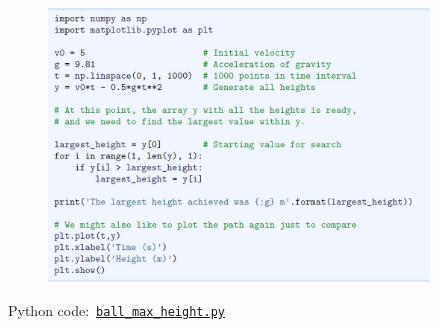\documentclass[english,14pt]{beamer}
\begin{document}

\begin{frame}[fragile]

\frametitle{}

\begin{figure}[ht]
	\centering
	\includegraphics[width=0.9\textwidth]{figures/LLp71a}
\end{figure}
\vspace*{-3mm}
Python code:~\href{https://github.com/slgit/prog4comp_2/blob/master/py36-src/ball_max_height.py}{\texttt{ball\_max\_height.py}}

\end{frame}

\end{document}
